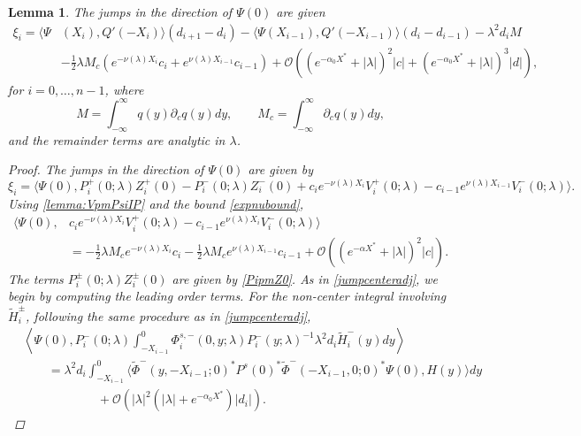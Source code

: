 \documentclass[12pt]{elsarticle}
\theoremstyle{plain}
\newtheorem{lemma}[theorem]{Lemma}
\theoremstyle{definition}
\theoremstyle{remark}
\numberwithin{theorem}{section}
\numberwithin{equation}{section}
\begin{document}
\begin{lemma}\label{jumpadj}
The jumps in the direction of $\Psi(0)$ are given 
\begin{equation}\label{jumpPsi0}
\begin{aligned}
\xi_i = \langle \Psi&(X_i), Q'(-X_i) \rangle (d_{i+1} - d_i ) - \langle \Psi(X_{i-1}), Q'(-X_{i-1}) \rangle (d_i - d_{i-1} ) - \lambda^2 d_i M  \\
&-\frac{1}{2}\lambda M_c \left( e^{-\nu(\lambda)X_i}c_i + e^{\nu(\lambda)X_{i-1}}c_{i-1} \right) + \mathcal{O}\left( (e^{-\alpha_0 X^*} + |\lambda|)^2 |c| + (e^{-\alpha_0 X^*} + |\lambda|)^3 |d| \right),
\end{aligned}
\end{equation}
for $i = 0, \dots, n-1$, where
\[
M = \int_{-\infty}^\infty q(y) \partial_c q(y) dy, \qquad
M_c = \int_{-\infty}^\infty \partial_c q(y) dy,
\]
and the remainder terms are analytic in $\lambda$.
\begin{proof}
The jumps in the direction of $\Psi(0)$ are given by
\[
\xi_i = 
\langle \Psi(0), P_i^+(0; \lambda) Z_i^+(0) - P_i^-(0; \lambda) Z_i^-(0) + c_i e^{-\nu(\lambda)X_i}V_i^+(0; \lambda) - c_{i-1} e^{\nu(\lambda)X_{i-1}} V_i^-(0; \lambda) \rangle.
\]
Using \cref{lemma:VpmPsiIP} and the bound \cref{expnubound},
\begin{align*}
\langle \Psi(0), &c_i e^{-\nu(\lambda)X_i}V_i^+(0; \lambda) - c_{i-1} e^{\nu(\lambda)X_i} V_i^-(0; \lambda) \rangle \\
&= -\frac{1}{2}\lambda M_c e^{-\nu(\lambda)X_i}c_i - \frac{1}{2}\lambda M_c e^{\nu(\lambda)X_{i-1}}c_{i-1} + \mathcal{O}\left( (e^{-\alpha X^*} +|\lambda|)^2 |c| \right). 
\end{align*}
The terms $P_i^\pm(0; \lambda) Z_i^\pm(0)$ are given by \cref{PipmZ0}. As in \cref{jumpcenteradj}, we begin by computing the leading order terms. For the non-center integral involving $\tilde{H}_i^\pm$, following the same procedure as in \cref{jumpcenteradj},
\begin{align*}
&\left\langle \Psi(0), P_i^-(0; \lambda) \int_{-X_{i-1}}^0 \Phi_i^{s,-}(0, y; \lambda) P_i^-(y; \lambda)^{-1} \lambda^2 d_i \tilde{H}_i^-(y) dy \right\rangle \\
&\qquad = \lambda^2 d_i \int_{-X_{i-1}}^0 \langle \tilde{\Phi}^-(y, -X_{i-1}; 0)^* P^s(0)^* \tilde{\Phi}^-(-X_{i-1}, 0; 0)^* \Psi(0), H(y) \rangle dy \\
&\qquad \qquad \qquad+ \mathcal{O}(|\lambda|^2( |\lambda| + {e^{-\alpha_0 X^*}})|d_i|).
\end{align*}

\end{proof}
\end{lemma}
\end{document}
